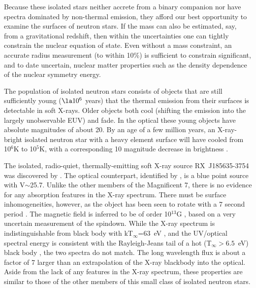 \documentclass[12pt,preprint]{aastex}
\begin{document}
Because these isolated stars neither accrete from a binary companion
nor have spectra dominated by non-thermal emission, 
they afford our best opportunity to examine the surfaces of neutron stars. 
If the mass can also be estimated, say, from a gravitational
redshift, then within the uncertainties one can tightly constrain the nuclear
equation of state.
Even without a mass constraint, an accurate radius measurement
(to within 10\%) is sufficient to constrain significant, and to date
uncertain, nuclear matter properties such as the density dependence of
the nuclear symmetry energy.

The population of isolated neutron stars consists of objects that
are still sufficiently young ($\la 10^6$ years) that the thermal emission from
their surfaces is detectable in soft X-rays. Older objects both cool (shifting
the emission into the largely unobservable EUV) and fade. In the optical
these young objects have absolute magnitudes of about 20.
By an age of a few million years, an X-ray-bright isolated neutron star with
a heavy element surface
will have cooled from 10$^6$K to 10$^5$K, with a corresponding
10 magnitude decrease in brightness \citep{P04}.


The isolated, radio-quiet, thermally-emitting soft X-ray source
RX~J185635-3754 was
discovered by \citet{WWN96}. The optical counterpart,
identified by \citet{WM97}, is a blue point source with V$\sim$25.7.
Unlike the other members of the
Magnificent 7, there is no evidence for any absorption features in the X-ray
spectrum. There must be surface inhomogeneities, however, as the object has
been seen to rotate with a 7 second period \citep{TM07}.
The magnetic field is inferred to be of order 10$^{13}$G \citep{vKK08}, based on
a very uncertain measurement of the spindown.
While the X-ray spectrum is indistinguishable from black body with
kT$_\infty$=63~eV
\citep{B03}, and the UV/optical spectral energy is consistent with
the Rayleigh-Jeans tail of a hot (T$_\infty>6.5$~eV) black body \citep{P01},
the two spectra do not 
match. The long wavelength flux is about a factor of 7 larger than an
extrapolation of the X-ray blackbody into the optical.
Aside from the lack of any features in the X-ray spectrum, these properties are
similar to those of the other members of this small class of
isolated neutron stars.
\end{document}
